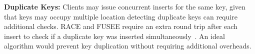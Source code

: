\textbf{Duplicate Keys:} Clients may issue concurrent
inserts for the same key, given that keys may occupy
multiple location detecting duplicate keys can require
additional checks. RACE and FUSEE require an extra round
trip after each insert to check if a duplicate key was
inserted simultaneously~\cite{race,fusee}.  An ideal
algorithm would prevent key duplication without requiring
additional overheads.